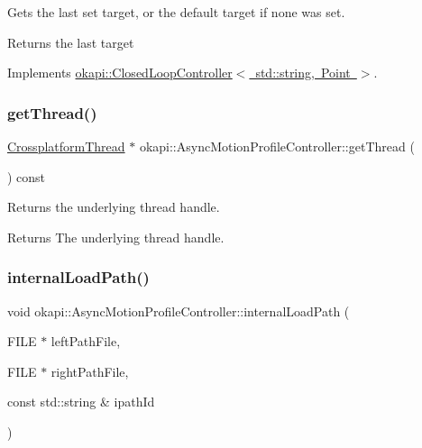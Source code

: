 Gets the last set target, or the default target if none was set.

\begin{DoxyReturn}{Returns}
the last target 
\end{DoxyReturn}


Implements \mbox{\hyperlink{classokapi_1_1ClosedLoopController_a22012bedbfaff6e5a3a508f274ec2497}{okapi\+::\+Closed\+Loop\+Controller$<$ std\+::string, Point $>$}}.

\mbox{\label{classokapi_1_1AsyncMotionProfileController_aaac5113b3567c28dc1c5ba0dcf7facdd}} 
\subsubsection{\texorpdfstring{getThread()}{getThread()}}
{\footnotesize\ttfamily \mbox{\hyperlink{classCrossplatformThread}{Crossplatform\+Thread}} $\ast$ okapi\+::\+Async\+Motion\+Profile\+Controller\+::get\+Thread (\begin{DoxyParamCaption}{ }\end{DoxyParamCaption}) const}

Returns the underlying thread handle.

\begin{DoxyReturn}{Returns}
The underlying thread handle. 
\end{DoxyReturn}
\mbox{\label{classokapi_1_1AsyncMotionProfileController_adc93d9516b749dee19f0af735d4b83cb}} 
\subsubsection{\texorpdfstring{internalLoadPath()}{internalLoadPath()}}
{\footnotesize\ttfamily void okapi\+::\+Async\+Motion\+Profile\+Controller\+::internal\+Load\+Path (\begin{DoxyParamCaption}\item[{F\+I\+LE $\ast$}]{left\+Path\+File,  }\item[{F\+I\+LE $\ast$}]{right\+Path\+File,  }\item[{const std\+::string \&}]{ipath\+Id }\end{DoxyParamCaption})\hspace{0.3cm}{\ttfamily [protected]}}

